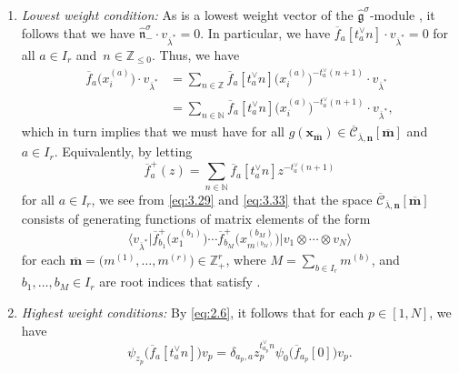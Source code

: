 \documentclass[pdftex]{sigma}
\numberwithin{equation}{section}
\begin{document}
\begin{enumerate}
\item[$(2)$] \emph{Lowest weight condition:} As  is a lowest weight vector of the $\widehat{ \mathfrak{g}}^{\sigma}$-module , it follows that we have $\widehat{ \mathfrak{n}}_-^{\sigma}\cdot v_{\overline{ \lambda}^*}=0$. In particular, we have $\overline{f}_a [t_a^{\vee}n]\cdot v_{ \overline{\lambda}^*}=0$ for all $a\in I_r$ and~${n\in\mathbb{ Z}_{\leq0}}$. Thus, we have
\begin{align}
\overline{f}_a\bigl(x_i^{(a)}\bigr)\cdot v_{\overline{\lambda}^*}
&=\sum_{n\in\mathbb{Z}}\overline{f}_a[t_a^{\vee}n]\bigl(x_i^{(a)}\bigr)^{-t_a^{\vee}(n+1)}\cdot v_{\overline{\lambda}^*}\nonumber\\
&=\sum_{n\in\mathbb{N}}\overline{f}_a[t_a^{\vee}n]\bigl(x_i^{(a)}\bigr)^{-t_a^{\vee}(n+1)}\cdot v_{\overline{\lambda}^*},\label{eq:3.33}
\end{align}
which in turn implies that we must have
for all $g(\mathbf{x}_{\overline{\mathbf{m}}})\in\overline{ \mathcal{C}}_{\overline{\lambda},\mathbf{n}}[\overline{ \mathbf{m}}]$ and $a\in I_r$. Equivalently, by letting
\begin{equation}\label{eq:3.35}
\overline{f}_a^+(z)=
\sum_{n\in\mathbb{N}}\overline{f}_a[t_a^{\vee}n]z^{-t_a^{\vee}(n+1)}
\end{equation}
for all $a\in I_r$, we see from \eqref{eq:3.29} and \eqref{eq:3.33} that the space $\overline{\mathcal{C}}_{ \overline{\lambda},\mathbf{n}}[\overline{\mathbf{m}}]$ consists of generating functions of matrix elements of the form
\begin{equation}\label{eq:3.36}
\big\langle v_{\overline{\lambda}^*}\big|\overline{f}_{b_1}^+\bigl(x_1^{(b_1)}\bigr)\cdots\overline{f}_{b_M}^+\bigl(x_{m^{(b_M)}}^{(b_M)}\bigr) \big|v_1\otimes\cdots\otimes v_N\big\rangle
\end{equation}
for each $\overline{\mathbf{m}}=\bigl(m^{(1)},\dots,m^{(r)}\bigr)\in \mathbb{Z}_+^r$, where $M=\sum_{b\in I_r}m^{(b)}$, and $b_1,\dots,b_M\in I_r$ are root indices that satisfy .
\item[$(3)$] \emph{Highest weight conditions:} By \eqref{eq:2.6}, it follows that for each $p\in[1,N]$, we have
\begin{equation*}
\psi_{z_p}\bigl(\overline{f}_a[t_a^{\vee}n]\bigr)v_p =\delta_{a_p,a}z_p^{t_{a_p}^{\vee}n}\psi_0\bigl(\overline{f}_{a_p}[0]\bigr)v_p.

\end{equation*}
\end{enumerate}
\end{document}
